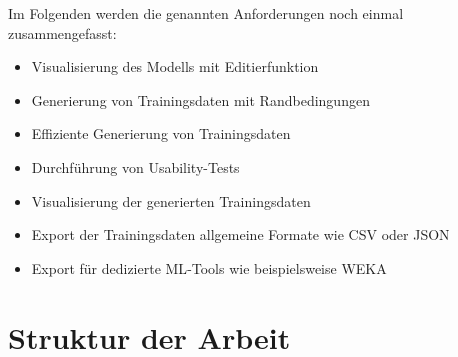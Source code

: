 Im Folgenden werden die genannten Anforderungen noch einmal zusammengefasst:
\begin{itemize}
    \item Visualisierung des Modells mit Editierfunktion
    \item Generierung von Trainingsdaten mit Randbedingungen
    \item Effiziente Generierung von Trainingsdaten
    \item Durchführung von Usability-Tests
    \item Visualisierung der generierten Trainingsdaten
    \item Export der Trainingsdaten allgemeine Formate wie CSV oder JSON 
    \item Export für dedizierte \ac{ML}-Tools wie beispielsweise WEKA
\end{itemize}

\section{Struktur der Arbeit}

